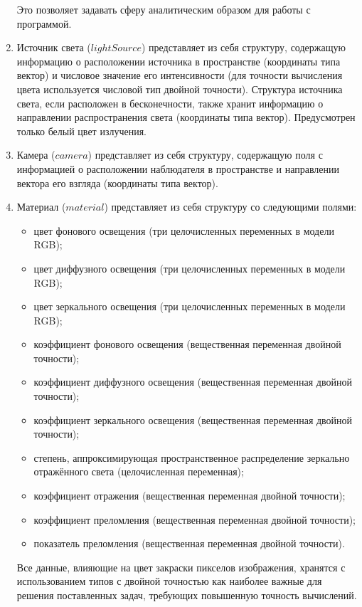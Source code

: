 \begin{enumerate}[label={\arabic*)}]
	Это позволяет задавать сферу аналитическим образом для работы с программой.
	\item Источник света ($lightSource$) представляет из себя структуру, содержащую информацию о расположении источника в пространстве (координаты типа вектор) и числовое значение его интенсивности (для точности вычисления цвета используется числовой тип двойной точности). Структура источника света, если расположен в бесконечности, также хранит информацию о направлении распространения света (координаты типа вектор). Предусмотрен только белый цвет излучения.
	\item Камера ($camera$) представляет из себя структуру, содержащую поля с информацией о расположении наблюдателя в пространстве и направлении вектора его взгляда (координаты типа вектор).
	\item Материал ($material$) представляет из себя структуру со следующими полями: \begin{itemize}
		\item цвет фонового освещения (три целочисленных переменных в модели RGB);
		\item цвет диффузного освещения (три целочисленных переменных в модели RGB);
		\item цвет зеркального освещения (три целочисленных переменных в модели RGB);
		\item коэффициент фонового освещения (вещественная переменная двойной точности);
		\item коэффициент диффузного освещения (вещественная переменная двойной точности);
		\item коэффициент зеркального освещения (вещественная переменная двойной точности);
		\item степень, аппроксимирующая пространственное распределение зеркально отражённого света (целочисленная переменная);
		\item коэффициент отражения (вещественная переменная двойной точности);
		\item коэффициент преломления (вещественная переменная двойной точности);
		\item показатель преломления (вещественная переменная двойной точности).
	    \end{itemize}
	    Все данные, влияющие на цвет закраски пикселов изображения, хранятся с использованием типов с двойной точностью как наиболее важные для решения поставленных задач, требующих повышенную точность вычислений.
\end{enumerate}

%

